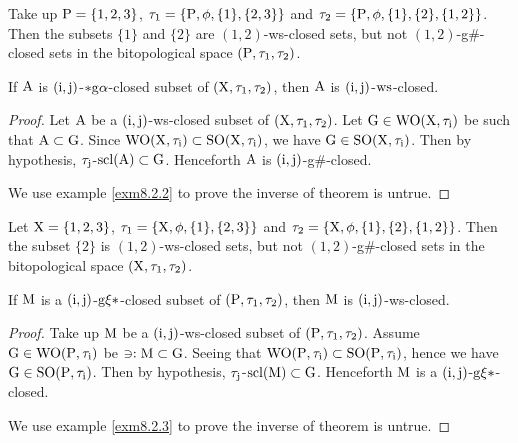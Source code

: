 \begin{exm}\label{exm8.2.1}
Take up $\mathrm{P}= \{1,2,3\}$, $\tau_1 =\{\mathrm{P}, \phi, \{1\}, \{2,3\}\}$ and $\tau_2 =\{\TSP, \phi, \{1\},\break \{2\}, \{1,2\}\}$. Then the subsets $\{1\}$ and $\{2\}$ are $(1, 2)$-ws-closed sets, but not $(1, 2)$-g\#-closed sets in the bitopological space $(\mathrm{P}, \tau_1, \tau_2 )$.
\end{exm}

\begin{thm}\label{thm8.2.2}
If $\mathrm{A}$ is $(\mathrm{i}, \mathrm{j})$-$*\mathrm{g}\alpha$-closed subset of $(\mathrm{X}, \tau_1, \tau_2)$, then $\mathrm{A}$ is $(\mathrm{i}, \mathrm{j})$-$\mathrm{ws}$-closed.
\end{thm}

\begin{proof}
Let $\mathrm{A}$ be a $(\mathrm{i}, \mathrm{j})$-ws-closed subset of $(\mathrm{X}, \tau_1, \tau_2)$. Let $\mathrm{G}\in\mathrm{W}\mathrm{O}(\mathrm{X}, \tau_{\mathrm{i}})$ be such that $\mathrm{A} \subset \mathrm{G}$. Since $\mathrm{W}\mathrm{O}(\mathrm{X}, \tau_{\mathrm{i}}) \subset \mathrm{S}\mathrm{O}(\mathrm{X}, \tau_{\mathrm{i}})$, we have $\mathrm{G}\in\mathrm{S}\mathrm{O}(\mathrm{X}, \tau_{\mathrm{i}})$. Then by hypothesis, $\tau_{\mathrm{j}}$-$\mathrm{scl}(\mathrm{A}) \subset \mathrm{G}$. Henceforth $\mathrm{A}$ is $(\mathrm{i}, \mathrm{j})$-g\#-closed.

We use example \ref{exm8.2.2} to prove the inverse of theorem is untrue.
\end{proof}

\begin{exm}\label{exm8.2.2}
Let $\mathrm{X}= \{1, 2, 3\}$, $\tau_1 =\{\mathrm{X}, \phi, \{1\}, \{2,3\}\}$ and $\tau_2 =\{\TSX, \phi, \{1\}, \{2\},\break \{1,2\}\}$. Then the subset $\{2\}$ is $(1, 2)$-ws-closed sets, but not $(1, 2)$-g\#-closed sets in the bitopological space $(\mathrm{X}, \tau_1, \tau_2 )$.
\end{exm}

\begin{thm}\label{thm8.2.3}
If $\mathrm{M}$ is a $(\mathrm{i}, \mathrm{j})$-$\mathrm{g}\xi*$-closed subset of $(\mathrm{P}, \tau_1, \tau_2)$, then $\mathrm{M}$ is $(\mathrm{i}, \mathrm{j})$-ws-closed.
\end{thm}

\begin{proof}
Take up $\mathrm{M}$ be a $(\mathrm{i}, \mathrm{j})$-ws-closed subset of $(\mathrm{P}, \tau_1, \tau_2 )$. Assume $\mathrm{G}\in \mathrm{W}\mathrm{O}(\mathrm{P}, \tau_{\mathrm{i}})$ be $\ni: \mathrm{M} \subset
\mathrm{G}$. Seeing that $\mathrm{W}\mathrm{O}(\mathrm{P}, \tau_{\mathrm{i}}) \subset \mathrm{S}\mathrm{O}(\mathrm{P}, \tau_{\mathrm{i}})$, hence we have $\mathrm{G}\in\mathrm{S}\mathrm{O}(\mathrm{P}, \tau_{\mathrm{i}})$. Then by hypothesis, $\tau_{\mathrm{j}}$-$\mathrm{scl}(\mathrm{M}) \subset \mathrm{G}$. Henceforth $\mathrm{M}$ is a $(\mathrm{i}, \mathrm{j})$-$\mathrm{g}\xi*$-closed.

We use example \ref{exm8.2.3} to prove the inverse of theorem is untrue.
\end{proof}

